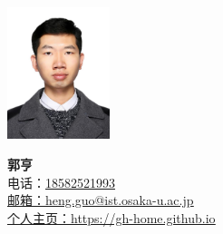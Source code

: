 \documentclass[A4, 11pt, UTF8]{ctexart}
\begin{document}
		
		\begin{minipage}[c]{0.05\textwidth}
			\-\
		\end{minipage}
		\begin{minipage}[c]{0.2\textwidth}
			{\includegraphics[width = 3cm]{photo}}
			\hfill\vline\hfill
		\end{minipage}
		\begin{minipage}[c]{0.4\textwidth}
			\textbf{\Huge \scshape{郭亨}} \\ \vspace{3pt} 
			{电话：\underline{18582521993}} \\
			\href{mailto:heng.guo@ist.osaka-u.ac.jp}{邮箱：\underline{heng.guo@ist.osaka-u.ac.jp}}\\
			\href{https://gh-home.github.io/}{个人主页：\underline{https://gh-home.github.io}} \\
		\end{minipage}
		
\end{document}
